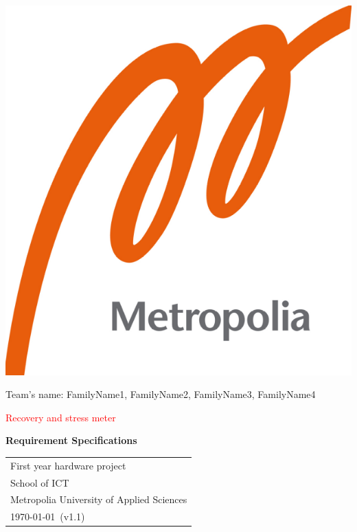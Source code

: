 \documentclass{article}
\begin{document}
\begin{center}
\includegraphics[scale=0.2]{logo.png}

\end{center}

\vspace{0.5cm}

\begin{center}

 Team's name: FamilyName1, FamilyName2, FamilyName3, FamilyName4 \\

\vspace{0.5cm}

{\Huge \textcolor{red}{Recovery and stress meter}} \\


\vspace{0.5cm}

{\Large \textbf{Requirement Specifications}} \\


\end{center}

\vspace{1cm}

\begin{center}

{\Large }



\begin{tabular}{l}
 First year hardware project \\
 School of ICT\\
 Metropolia University of Applied Sciences  \\
 \today \, (v1.1)
\end{tabular}
\end{center}
\end{document}
